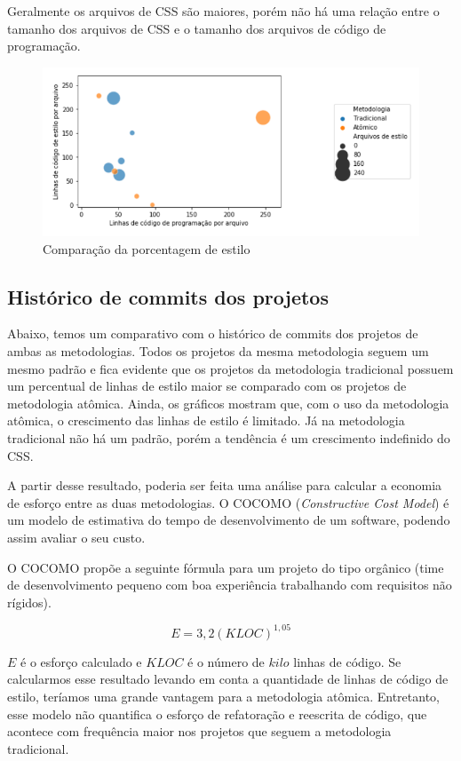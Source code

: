 Geralmente os arquivos de CSS são maiores, porém não há uma relação entre o tamanho dos arquivos de CSS e o tamanho dos arquivos de código de programação.


\begin{figure}[H]
\centering
\includegraphics{figuras/estilo-por-arquivo.png}
\caption{Comparação da porcentagem de estilo}
\end{figure}

\hypertarget{porcentagem de estilo}{%
\subsection{Histórico de commits dos projetos}\label{parcel}}

Abaixo, temos um comparativo com o histórico de commits dos projetos de ambas as metodologias. Todos os projetos da mesma metodologia seguem um mesmo padrão e fica evidente que os projetos da metodologia tradicional possuem um percentual de linhas de estilo maior se comparado com os projetos de metodologia atômica. Ainda, os gráficos mostram que, com o uso da metodologia atômica, o crescimento das linhas de estilo é limitado. Já na metodologia tradicional não há um padrão, porém a tendência é um crescimento indefinido do CSS.

A partir desse resultado, poderia ser feita uma análise para calcular a economia de esforço entre as duas metodologias. O COCOMO (\emph{Constructive Cost Model}) é um modelo de estimativa do tempo de desenvolvimento de um software, podendo assim avaliar o seu custo.

O COCOMO propõe a seguinte fórmula para um projeto do tipo orgânico (time de desenvolvimento pequeno com boa experiência trabalhando com requisitos não rígidos).

 \[E = 3,2(KLOC)^{1,05}\]

$E$ é o esforço calculado e $KLOC$ é o número de $kilo$ linhas de código. Se calcularmos esse resultado levando em conta a quantidade de linhas de código de estilo, teríamos uma grande vantagem para a metodologia atômica. Entretanto, esse modelo não quantifica o esforço de refatoração e reescrita de código, que acontece com frequência maior nos projetos que seguem a metodologia tradicional.

